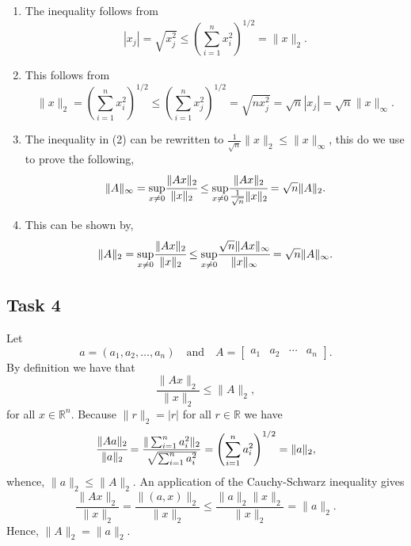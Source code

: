 \documentclass[a4paper,12pt]{article}
\begin{document}
\begin{enumerate}
  \item
    The inequality follows from
    \[
      |x_j|
        = \sqrt{x_j^2}
        \le \left(\sum_{i=1}^n x_i^2\right)^{1/2}
        = \|x\|_2.
    \]

  \item
    This follows from
    \[
      \|x\|_2
        = \left(\sum_{i=1}^n x_i^2\right)^{1/2}
        \le \left(\sum_{i=1}^n x_j^2\right)^{1/2}
        = \sqrt{nx_j^2}
        = \sqrt{n}|x_j|
        = \sqrt{n}\|x\|_\infty.
    \]

  \item
  The inequality in (2) can be rewritten to $ \frac{1}{\sqrt{n}} \|x\|_2 \le \|x\|_\infty$, this do we use to prove the following,
  \[
  \|A\|_\infty =\underset{x\not=0}{\sup} \cfrac{\|Ax\|_2}{\|x\|_2}\le
  \underset{x\not=0}{\sup}
  \cfrac{\|Ax\|_2}{\frac{1}{\sqrt{n}}\|x\|_2}=\sqrt{n}\|A\|_2.
  \]

  \iffalse
    The maximum preserves inequalities, so by 1 we have:
    \[
      \|A\|_\infty
        = \max_{\|x\| = 1} \|Ax\|_\infty
        \le \max_{\|x\| = 1} \|Ax\|_2
        = \|A\|_2,
    \]
    and obviously \(\|A\|_2 \le \sqrt{n}\|A\|_2\).
  \fi
  \item

  This can be shown by,
  \[
  \|A\|_2=\underset{x\not=0}{\sup} \cfrac{\|Ax\|_2}{\|x\|_2}\le \underset{x\not=0}{\sup} \cfrac{\sqrt{n}\|Ax\|_\infty}{\|x\|_\infty} =\sqrt{n}\|A\|_\infty.
  \]
  \iffalse
    Again by the fact that the maximum preserves inequalities, 2 gives
    \begin{align*}
      \|A\|_2
      &= \max_{\|x\| = 1} \|Ax\|_2 \\
      &\le \max_{\|x\| = 1} \sqrt{n}\|Ax\|_\infty \\
      &= \sqrt{n} \max_{\|x\| = 1} \|Ax\|_\infty \\
      &= \sqrt{n} \|Ax\|_\infty.
    \end{align*}
  \fi
\end{enumerate}


\subsection*{Task 4}

Let
\[
  a = (a_1, a_2, \dots, a_n)
  \quad \text{and} \quad
  A =
    \begin{bmatrix}
      a_1 & a_2 & \cdots & a_n
    \end{bmatrix}.
\]
By definition we have that
\[ \frac{\|Ax\|_2}{\|x\|_2} \le \|A\|_2, \]
for all \(x\in \mathbb{R}^n\).
Because \(\|r\|_2 = |r|\) for all \(r \in \mathbb{R}\) we have
\[
  \cfrac{\|Aa\|_2}{\|a\|_2}
    = \frac{\|\sum_{i=1}^n a_i^2\|_2}{\sqrt{\sum_{i=1}^n a_i^2}}
    = \left(\sum_{i=1}^{n} a_i^2\right)^{1/2}
    = \|a\|_2,
\]
whence, \(\|a\|_2\le \|A\|_2\).
An application of the Cauchy-Schwarz inequality gives
\[
  \frac{\|Ax\|_2}{\|x\|_2}
    = \frac{\|(a,x)\|_2}{\|x\|_2}
    \le \frac{\|a\|_2 \|x\|_2}{\|x\|_2}
    = \|a\|_2.
\]
Hence, \(\|A\|_2= \|a\|_2\).
\end{document}
